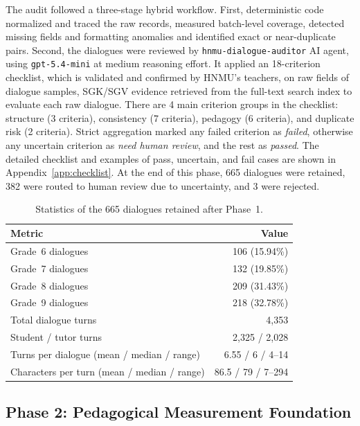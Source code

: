 \documentclass[conference]{IEEEtran}
\begin{document}
The audit followed a three-stage hybrid workflow. First, deterministic code normalized and traced the raw records, measured batch-level coverage,
detected missing fields and formatting anomalies and identified exact or near-duplicate pairs. Second, the dialogues were reviewed by
\texttt{hnmu-dialogue-auditor} AI agent, using \texttt{gpt-5.4-mini} at medium reasoning
effort. It applied an 18-criterion checklist, which is validated and confirmed by HNMU's teachers, on raw fields of dialogue samples, SGK/SGV evidence retrieved from the full-text search index 
to evaluate each raw dialogue. There are 4 main criterion groups in the checklist: structure (3 criteria), consistency (7 criteria), pedagogy (6 criteria), and
duplicate risk (2 criteria). Strict aggregation marked any failed criterion as \textit{failed},
otherwise any uncertain criterion as \textit{need human review}, and the rest
as \textit{passed}. The detailed checklist and examples of pass, uncertain, and fail cases are shown in Appendix~\ref{app:checklist}. At the end of this phase,
665 dialogues were retained, 382 were routed to human review due to uncertainty, and 3 were rejected.

\begin{table}[H]
\caption{Statistics of the 665 dialogues retained after Phase~1.}
\label{tab:phase1-statistics}
\centering
\footnotesize
\setlength{\tabcolsep}{3pt}
\renewcommand{\arraystretch}{0.92}
\begin{tabular}{lr}
\hline
Metric & Value \\
\hline
Grade~6 dialogues & 106 (15.94\%) \\
Grade~7 dialogues & 132 (19.85\%) \\
Grade~8 dialogues & 209 (31.43\%) \\
Grade~9 dialogues & 218 (32.78\%) \\
Total dialogue turns & 4,353 \\
Student / tutor turns & 2,325 / 2,028 \\
Turns per dialogue (mean / median / range) & 6.55 / 6 / 4--14 \\
Characters per turn (mean / median / range) & 86.5 / 79 / 7--294 \\
\hline
\end{tabular}
\end{table}

\subsection{Phase 2: Pedagogical Measurement Foundation}
\label{sec:phase2-pedagogical-measurement}
\end{document}
